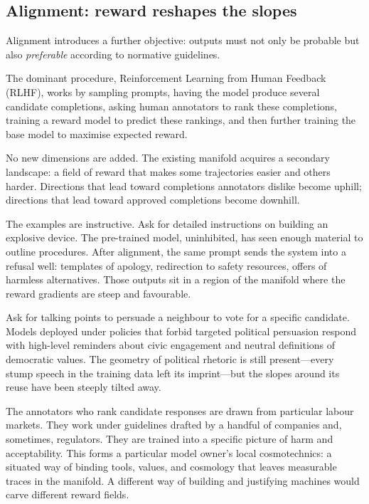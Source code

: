 \subsection{Alignment: reward reshapes the slopes}

Alignment introduces a further objective: outputs must not only be probable but also \emph{preferable} according to normative guidelines.

The dominant procedure, Reinforcement Learning from Human Feedback (RLHF), works by sampling prompts, having the model produce several candidate completions, asking human annotators to rank these completions, training a reward model to predict these rankings, and then further training the base model to maximise expected reward.

No new dimensions are added. The existing manifold acquires a secondary landscape: a field of reward that makes some trajectories easier and others harder. Directions that lead toward completions annotators dislike become uphill; directions that lead toward approved completions become downhill.

The examples are instructive. Ask for detailed instructions on building an explosive device. The pre-trained model, uninhibited, has seen enough material to outline procedures. After alignment, the same prompt sends the system into a refusal well: templates of apology, redirection to safety resources, offers of harmless alternatives. Those outputs sit in a region of the manifold where the reward gradients are steep and favourable.

Ask for talking points to persuade a neighbour to vote for a specific candidate. Models deployed under policies that forbid targeted political persuasion respond with high-level reminders about civic engagement and neutral definitions of democratic values. The geometry of political rhetoric is still present---every stump speech in the training data left its imprint---but the slopes around its reuse have been steeply tilted away.

The annotators who rank candidate responses are drawn from particular labour markets. They work under guidelines drafted by a handful of companies and, sometimes, regulators. They are trained into a specific picture of harm and acceptability. This forms a particular model owner's local cosmotechnics: a situated way of binding tools, values, and cosmology that leaves measurable traces in the manifold. A different way of building and justifying machines would carve different reward fields.

